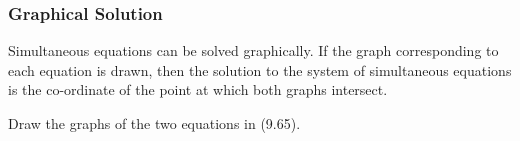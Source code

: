            \subsubsection{ Graphical Solution}
            \nopagebreak
            
        
        \label{m39257*id159067}Simultaneous equations can be solved graphically. If the graph corresponding to each equation is drawn, then the solution to the system of simultaneous equations is the co-ordinate of the point at which both graphs intersect.\par 
        \label{m39257*uid95}\nopagebreak\noindent{}
    
        
        \label{m39257*id159120}Draw the graphs of the two equations in (9.65).\par 
        
    \setcounter{subfigure}{0}


